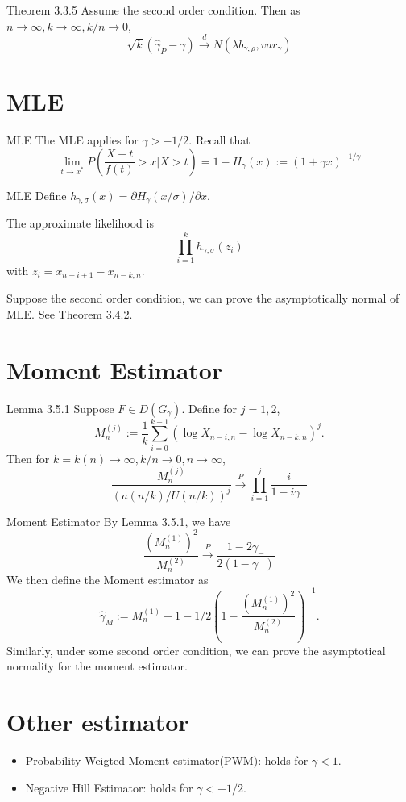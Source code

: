 \documentclass{beamer}
\begin{document}
\begin{frame}{Theorem 3.3.5}
    Assume the second order condition. Then as $n\to \infty,k\to\infty,k/n \to 0$,
    $$
\sqrt{k}(\hat{\gamma}_P-\gamma)\stackrel{d}{\to} N(\lambda b_{\gamma,\rho},var_{\gamma})
    $$
\end{frame}


\section{MLE}
\begin{frame}{MLE}
The MLE applies for $\gamma>-1/2$.
    Recall that
    $$
\lim_{t\to x^*}P\left( \dfrac{X-t}{f(t)}>x|X>t\right)=1-H_{\gamma}(x):=(1+\gamma x)^{-1/\gamma}
    $$
\end{frame}

\begin{frame}{MLE}
    Define $h_{\gamma ,\sigma}(x)=\partial H_{\gamma}(x/\sigma)/\partial x$.

    The approximate likelihood is 
    $$
\prod_{i=1}^k h_{\gamma,\sigma}(z_i)
    $$
    with $z_i = x_{n-i+1} - x_{n-k,n}$.

    Suppose the second order condition, we can prove the asymptotically normal of MLE. See Theorem 3.4.2.
\end{frame}

\section{Moment Estimator}
\begin{frame}{Lemma 3.5.1}
    Suppose $F\in D(G_{\gamma})$. Define for $j=1,2$,
    $$
M_n^{(j)}:=\dfrac{1}{k}\sum_{i=0}^{k-1} (\log X_{n-i,n}-\log X_{n-k,n})^j.
    $$
    Then for $k=k(n) \to \infty, k/n \to  0, n\to \infty$,
$$
\dfrac{M_n^{(j)}}{(a(n/k)/U(n/k))^j}\stackrel{P}{\to}\prod_{i=1}^j \dfrac{i}{1-i\gamma_{-}}
$$
\end{frame}

\begin{frame}{Moment Estimator}
    By Lemma 3.5.1, we have 
    $$
\dfrac{(M_n^{(1)})^2}{M_n^{(2)}} \stackrel{P}{\to} \dfrac{1-2\gamma_{-}}{2(1-\gamma_{-})}
    $$
    We then define the Moment estimator as 
$$
\hat{\gamma}_M:= M_n^{(1)}+1-1/2\left(1-\dfrac{(M_n^{(1)})^2}{M_n^{(2)}}\right)^{-1}.
$$
Similarly, under some second order condition, we can prove the asymptotical normality for the moment estimator.
\end{frame}

\section{Other estimator}
\begin{frame}
    \begin{itemize}
        \item Probability Weigted Moment estimator(PWM): holds for $\gamma<1$.
        \item Negative Hill Estimator: holds for $\gamma<-1/2$.
    \end{itemize}
\end{frame}
\end{document}
